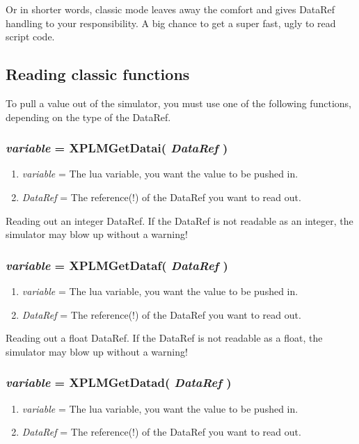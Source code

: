 \documentclass[11pt,parskip=half,a4paper]{scrartcl}
\begin{document}
Or in shorter words, classic mode leaves away the comfort and gives DataRef handling to your responsibility. A big chance to get a super fast, ugly to read script code.

\subsection{Reading classic functions}

To pull a value out of the simulator, you must use one of the following functions, depending on the type of the DataRef.

\subsubsection{\emph{variable} = XPLMGetDatai( \emph{DataRef} )}

\begin{enumerate}
	\item \emph{variable} = The lua variable, you want the value to be pushed in.
	\item \emph{DataRef} = The reference(!) of the DataRef you want to read out.
\end{enumerate}

Reading out an integer DataRef. If the DataRef is not readable as an integer, the simulator may blow up without a warning!

\subsubsection{\emph{variable} = XPLMGetDataf( \emph{DataRef} )}

\begin{enumerate}
	\item \emph{variable} = The lua variable, you want the value to be pushed in.
	\item \emph{DataRef} = The reference(!) of the DataRef you want to read out.
\end{enumerate}

Reading out a float DataRef. If the DataRef is not readable as a float, the simulator may blow up without a warning!

\subsubsection{\emph{variable} = XPLMGetDatad( \emph{DataRef} )}

\begin{enumerate}
	\item \emph{variable} = The lua variable, you want the value to be pushed in.
	\item \emph{DataRef} = The reference(!) of the DataRef you want to read out.
\end{enumerate}
\end{document}
